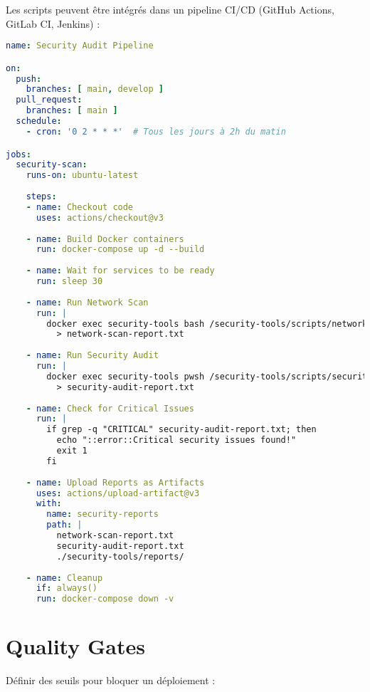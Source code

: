 \documentclass[11pt,a4paper]{report}
\begin{document}
Les scripts peuvent être intégrés dans un pipeline CI/CD (GitHub Actions, GitLab CI, Jenkins) :

\begin{lstlisting}[language=YAML, caption=Exemple GitHub Actions Workflow, basicstyle=\ttfamily\tiny]
name: Security Audit Pipeline

on:
  push:
    branches: [ main, develop ]
  pull_request:
    branches: [ main ]
  schedule:
    - cron: '0 2 * * *'  # Tous les jours à 2h du matin

jobs:
  security-scan:
    runs-on: ubuntu-latest
    
    steps:
    - name: Checkout code
      uses: actions/checkout@v3
    
    - name: Build Docker containers
      run: docker-compose up -d --build
    
    - name: Wait for services to be ready
      run: sleep 30
    
    - name: Run Network Scan
      run: |
        docker exec security-tools bash /security-tools/scripts/network-scan.sh \
          > network-scan-report.txt
    
    - name: Run Security Audit
      run: |
        docker exec security-tools pwsh /security-tools/scripts/security-audit.ps1 \
          > security-audit-report.txt
    
    - name: Check for Critical Issues
      run: |
        if grep -q "CRITICAL" security-audit-report.txt; then
          echo "::error::Critical security issues found!"
          exit 1
        fi
    
    - name: Upload Reports as Artifacts
      uses: actions/upload-artifact@v3
      with:
        name: security-reports
        path: |
          network-scan-report.txt
          security-audit-report.txt
          ./security-tools/reports/
    
    - name: Cleanup
      if: always()
      run: docker-compose down -v
\end{lstlisting}

\section{Quality Gates}

Définir des seuils pour bloquer un déploiement :
\end{document}
